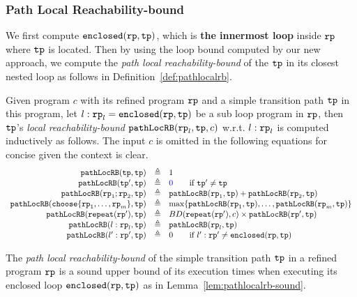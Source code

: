 \subsubsection{Path Local Reachability-bound}
We first compute $\mathtt{enclosed}(\mathtt{rp}, \mathtt{tp})$, which is \textbf{the innermost loop} inside $\mathtt{rp}$ where $\mathtt{tp}$ is located. Then by using the loop bound computed by our new approach, we compute the \emph{path local reachability-bound} of
the $\mathtt{tp}$ in its closest nested loop as follows in Definition~\ref{def:pathlocalrb}.
\begin{defn}
    \label{def:pathlocalrb}
    Given program $c$ with its refined program $\mathtt{rp}$ and a simple transition path $\mathtt{tp}$ in this program, 
    let $l: \mathtt{rp}_l = \mathtt{enclosed}(\mathtt{rp}, \mathtt{tp})$ be a sub loop program in $\mathtt{rp}$,
    then $\mathtt{tp}$'s \emph{local reachability-bound} $\mathtt{pathLocRB}(\mathtt{rp}_l, \mathtt{tp}, c)$ w.r.t. $l: \mathtt{rp}_l$
    is computed inductively as follows.
    The input $c$ is omitted in the following equations for concise given the context is clear.
    {\small
    \[
    \begin{array}{rcl}
      \outinB(\tpath, \tpath) & \triangleq & 1 \\
      \outinB(\tpath', \tpath) & \triangleq & \highlight{0} \qquad \text{if } \tpath' \neq \tpath\\
      \outinB(\rprog_1;\rprog_2, \tpath) & \triangleq & \outinB(\rprog_1, \tpath) + \outinB(\rprog_2, \tpath) \\
      \outinB(\rpchoose{\rprog_1, \ldots, \rprog_m }, \tpath) & \triangleq 
      & \max\left\{ \outinB(\rprog_1, \tpath), \ldots, \outinB(\rprog_m, \tpath) \right\} \\
      \outinB(\rprepeat(\rprog'), \tpath) & \triangleq 
      & BD(\rprepeat(\rprog'), c) \times \outinB(\rprog', \tpath)
       \\
       \outinB(l: \rprog_l, \tpath) & \triangleq & \outinB(\rprog_l, \tpath) \\
       \outinB(l': \rprog', \tpath) & \triangleq & 0  \qquad \text{if } l': \rprog' \neq \kw{enclosed}(\rprog, \tpath)
    \end{array}
    \]
    }
  \end{defn}
The \emph{path local reachability-bound} of the simple transition path $\mathtt{tp}$ in a refined program $\mathtt{rp}$ is a sound upper bound of its execution times when executing its enclosed loop $\mathtt{enclosed}(\mathtt{rp}, \mathtt{tp})$ as in Lemma~\ref{lem:pathlocalrb-sound}.
